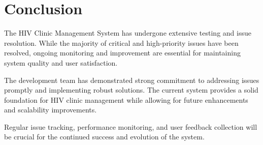 \documentclass[12pt,a4paper]{article}
\begin{document}
\section{Conclusion}

The HIV Clinic Management System has undergone extensive testing and issue resolution. While the majority of critical and high-priority issues have been resolved, ongoing monitoring and improvement are essential for maintaining system quality and user satisfaction.

The development team has demonstrated strong commitment to addressing issues promptly and implementing robust solutions. The current system provides a solid foundation for HIV clinic management while allowing for future enhancements and scalability improvements.

Regular issue tracking, performance monitoring, and user feedback collection will be crucial for the continued success and evolution of the system.
\end{document}
